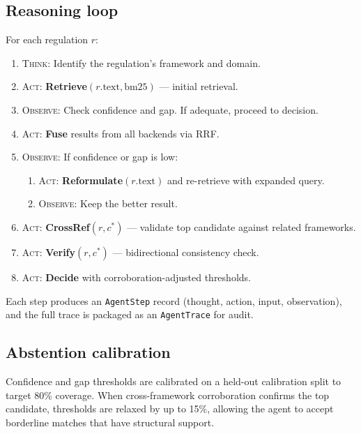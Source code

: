 \documentclass{sn-jnl}
\begin{document}
\subsection{Reasoning loop}
For each regulation $r$:
\begin{enumerate}
\item \textsc{Think}: Identify the regulation's framework and domain.
\item \textsc{Act}: \textbf{Retrieve}$(r.\text{text}, \text{bm25})$ --- initial retrieval.
\item \textsc{Observe}: Check confidence and gap. If adequate, proceed to decision.
\item \textsc{Act}: \textbf{Fuse} results from all backends via RRF.
\item \textsc{Observe}: If confidence or gap is low:
  \begin{enumerate}
  \item \textsc{Act}: \textbf{Reformulate}$(r.\text{text})$ and re-retrieve with expanded query.
  \item \textsc{Observe}: Keep the better result.
  \end{enumerate}
\item \textsc{Act}: \textbf{CrossRef}$(r, c^*)$ --- validate top candidate against related frameworks.
\item \textsc{Act}: \textbf{Verify}$(r, c^*)$ --- bidirectional consistency check.
\item \textsc{Act}: \textbf{Decide} with corroboration-adjusted thresholds.
\end{enumerate}

Each step produces an \texttt{AgentStep} record (thought, action, input, observation), and the full trace is packaged as an \texttt{AgentTrace} for audit.

\subsection{Abstention calibration}
Confidence and gap thresholds are calibrated on a held-out calibration split to target 80\% coverage.
When cross-framework corroboration confirms the top candidate, thresholds are relaxed by up to 15\%, allowing the agent to accept borderline matches that have structural support.
\end{document}

